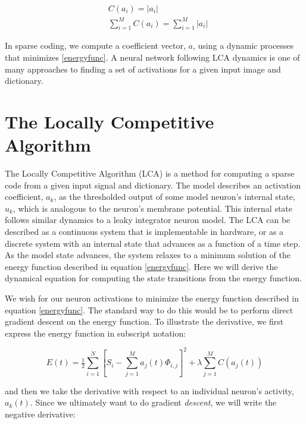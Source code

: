 \begin{align}\label{l1cost}
  &C(a_{i}) = |a_{i}| \\
  &\sum\limits_{i=1}^{M}C(a_{i}) = \sum\limits_{i=1}^{M}|a_{i}|
\end{align}

In sparse coding, we compute a coefficient vector, $a$, using a dynamic processes that minimizes \eqref{energyfunc}. A neural network following LCA dynamics is one of many approaches to finding a set of activations for a given input image and dictionary.

\section{The Locally Competitive Algorithm}
The Locally Competitive Algorithm (LCA) is a method for computing a sparse code from a given input signal and dictionary. The model describes an activation coefficient, $a_{k}$, as the thresholded output of some model neuron's internal state, $u_{k}$, which is analogous to the neuron's membrane potential. This internal state follows similar dynamics to a leaky integrator neuron model. The LCA can be described as a continuous system that is implementable in hardware, or as a discrete system with an internal state that advances as a function of a time step. As the model state advances, the system relaxes to a minimum solution of the energy function described in equation \eqref{energyfunc}. Here we will derive the dynamical equation for computing the state transitions from the energy function.

We wish for our neuron activations to minimize the energy function described in equation \eqref{energyfunc}. The standard way to do this would be to perform direct gradient descent on the energy function. To illustrate the derivative, we first express the energy function in subscript notation:

\begin{equation}
    E(t) = \tfrac{1}{2} \sum\limits_{i=1}^{N} \left[ S_{i} - \sum\limits_{j=1}^{M}a_{j}(t) \Phi_{i,j} \right]^{2} + \lambda \sum\limits_{j=1}^{M} C(a_{j}(t))
\label{indexenergyfunc}
\end{equation}

and then we take the derivative with respect to an individual neuron's activity, $a_{k}(t)$. Since we ultimately want to do gradient \textit{descent}, we will write the negative derivative:

